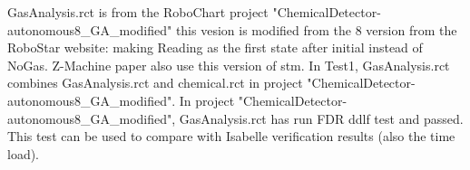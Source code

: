 GasAnalysis.rct is from the RoboChart project "ChemicalDetector-autonomous8_GA_modified"
this vesion is modified from the 8 version from the RoboStar website: making Reading as the first state after initial instead of NoGas.
Z-Machine paper also use this version of stm.
In Test1, GasAnalysis.rct combines GasAnalysis.rct and chemical.rct in project "ChemicalDetector-autonomous8_GA_modified".
In project "ChemicalDetector-autonomous8_GA_modified", GasAnalysis.rct has run FDR ddlf test and passed. This test can be used 
to compare with Isabelle verification results (also the time load).
